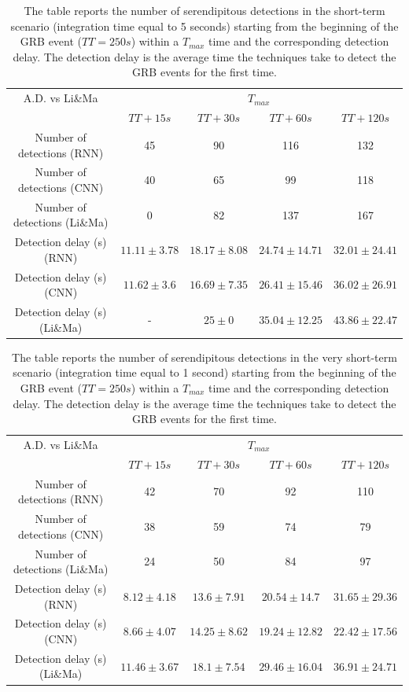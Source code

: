 \begin{table}[ht] %
\centering
\begin{tabular}{|c|cccc|} 
\hline
\multicolumn{1}{|c|}{A.D. vs Li\&Ma} & \multicolumn{4}{c|}{$T_{max}$}  \\
    & $TT+15s$ & $TT+30s$ &  $TT+60s$ & $TT+120s$  \\
\hline
Number of detections (RNN) & 45 & 90 & 116  & 132 \\
\hline
Number of detections (CNN) & 40 & 65 & 99 & 118 \\
\hline
Number of detections (Li\&Ma) & 0 & 82 & 137 & 167 \\
\hline
Detection delay (s) (RNN) & $11.11 \pm 3.78$ & $18.17 \pm 8.08$  & $24.74 \pm 14.71$   & $32.01 \pm 24.41$ \\
\hline
Detection delay (s) (CNN)& $11.62 \pm 3.6$ & $16.69 \pm 7.35$ & $26.41 \pm 15.46$  & $36.02 \pm 26.91$ \\
\hline
Detection delay (s) (Li\&Ma)& - & $25 \pm 0$ & $35.04 \pm 12.25$  & $43.86 \pm 22.47$ \\
\hline
\end{tabular}
\caption{The table reports the number of serendipitous detections in the short-term scenario (integration time equal to 5 seconds) starting from the beginning of the GRB event ($TT=250s$) within a $T_{max}$ time and the corresponding detection delay. The detection delay is the average time the techniques take to detect the GRB events for the first time.}
\label{tab:serendipitous-detections-itime-5}
\end{table}
\begin{table}[ht] %
\centering
\begin{tabular}{|c|cccc|} 
\hline
\multicolumn{1}{|c|}{A.D. vs Li\&Ma} & \multicolumn{4}{c|}{$T_{max}$}  \\
    & $TT+15s$ & $TT+30s$ &  $TT+60s$ & $TT+120s$  \\
\hline
Number of detections (RNN) & 42 & 70 & 92  & 110 \\
\hline
Number of detections (CNN) & 38 & 59 & 74 & 79 \\
\hline
Number of detections (Li\&Ma) & 24 & 50 & 84 & 97 \\
\hline
Detection delay (s) (RNN) & $8.12 \pm 4.18$ & $13.6 \pm 7.91$  & $20.54 \pm 14.7$   & $31.65 \pm 29.36$ \\
\hline
Detection delay (s) (CNN)& $8.66 \pm 4.07$ & $14.25 \pm 8.62$ & $19.24 \pm 12.82$  & $22.42 \pm 17.56$ \\
\hline
Detection delay (s) (Li\&Ma)& $11.46 \pm 3.67$ & $18.1 \pm 7.54$ & $29.46 \pm 16.04$  & $36.91 \pm 24.71$ \\
\hline
\end{tabular}
\caption{The table reports the number of serendipitous detections in the very short-term scenario (integration time equal to 1 second) starting from the beginning of the GRB event ($TT=250s$) within a $T_{max}$ time and the corresponding detection delay. The detection delay is the average time the techniques take to detect the GRB events for the first time.}
\label{tab:serendipitous-detections-itime-1}
\end{table}
